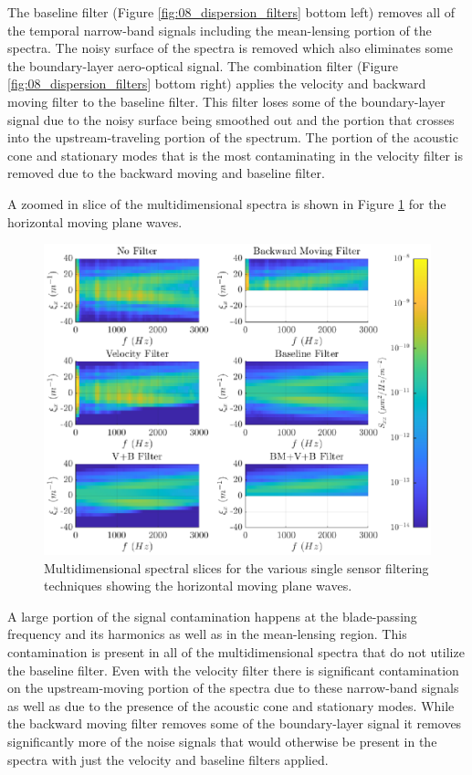 The baseline filter (Figure \ref{fig:08_dispersion_filters} bottom left) removes all of the temporal narrow-band signals including the mean-lensing portion of the spectra.
The noisy surface of the spectra is removed which also eliminates some the boundary-layer aero-optical signal.
The combination filter (Figure \ref{fig:08_dispersion_filters} bottom right) applies the velocity and backward moving filter to the baseline filter.
This filter loses some of the boundary-layer signal due to the noisy surface being smoothed out and the portion that crosses into the upstream-traveling portion of the spectrum.
The portion of the acoustic cone and stationary modes that is the most contaminating in the velocity filter is removed due to the backward moving and baseline filter.

A zoomed in slice of the multidimensional spectra is shown in Figure \ref{fig:08_dispersion_filters_slices} for the horizontal moving plane waves.
\begin{figure}
  \centering
  \includegraphics{../matlab/08_conclusion/dispersion_filters_slices.eps}
  \caption{Multidimensional spectral slices for the various single sensor filtering techniques showing the horizontal moving plane waves.}
  \label{fig:08_dispersion_filters_slices}
\end{figure}
A large portion of the signal contamination happens at the blade-passing frequency and its harmonics as well as in the mean-lensing region.
This contamination is present in all of the multidimensional spectra that do not utilize the baseline filter.
Even with the velocity filter there is significant contamination on the upstream-moving portion of the spectra due to these narrow-band signals as well as due to the presence of the acoustic cone and stationary modes.
While the backward moving filter removes some of the boundary-layer signal it removes significantly more of the noise signals that would otherwise be present in the spectra with just the velocity and baseline filters applied.

